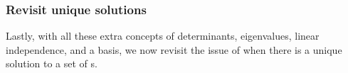 


\begin{comment} 
Optionally: Gram--Schmidt (probably not here as would confuse the aims of lin indep, next section); and something on change of basis, recalling quadratics.
\end{comment}








\subsubsection{Revisit unique solutions}
Lastly, with all these extra concepts of determinants, eigenvalues,  linear independence, and a basis, we now revisit the issue of when there is a unique solution to a set of s.


